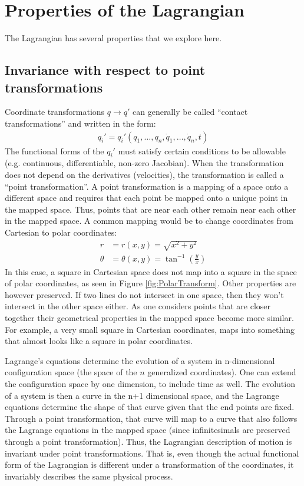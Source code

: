 \section{Properties of the Lagrangian}
The Lagrangian has several properties that we explore here.
\subsection{Invariance with respect to point transformations}
Coordinate transformations $q\to q'$ can generally be called ``contact transformations'' and written in the form:
\begin{align}
q_i'=q_i'(q_1,\dots , q_n, \dot{q}_1, \dots , \dot{q}_n, t)
\end{align}
The functional forms of the $q_i'$ must satisfy certain conditions to be allowable (e.g. continuous, differentiable, non-zero Jacobian). When the transformation does not depend on the derivatives (velocities), the transformation is called a ``point transformation''. A point transformation is a mapping of a space onto a different space and requires that each point be mapped onto a unique point in the mapped space. Thus, points that are near each other remain near each other in the mapped space. A common mapping would be to change coordinates from Cartesian to polar coordinates:
\begin{align}
r&=r(x,y)=\sqrt{x^2+y^2}\nonumber\\
\theta &=\theta(x,y)=\tan^{-1}(\frac{y}{x})
\end{align}
In this case, a square in Cartesian space does not map into a square in the space of polar coordinates, as seen in Figure \ref{fig:PolarTransform}. Other properties are however preserved. If two lines do not intersect in one space, then they won't intersect in the other space either. As one considers points that are closer together their geometrical properties in the mapped space become more similar. For example, a very small square in Cartesian coordinates, maps into something that almost looks like a square in polar coordinates. 


Lagrange's equations determine the evolution of a system in n-dimensional configuration space (the space of the $n$ generalized coordinates). One can extend the configuration space by one dimension, to include time as well. The evolution of a system is then a curve in the n+1 dimensional space, and the Lagrange equations determine the shape of that curve given that the end points are fixed. Through a point transformation, that curve will map to a curve that also follows the Lagrange equations in the mapped space (since infinitesimals are preserved through a point transformation). Thus, the Lagrangian description of motion is invariant under point transformations. That is, even though the actual functional form of the Lagrangian is different under a transformation of the coordinates, it invariably describes the same physical process.


